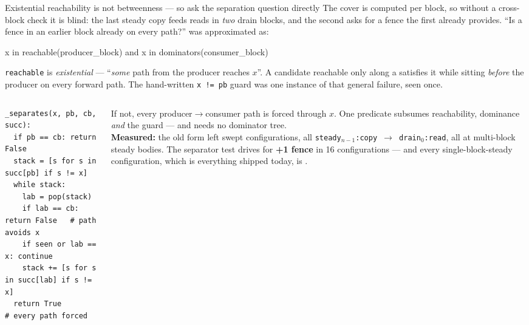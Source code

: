 \begin{frame}[fragile]{Existential reachability is not betweenness --- so ask the separation question directly}
\footnotesize
The cover is computed per block, so without a cross-block check it is blind: the last steady copy feeds reads in
\emph{two} drain blocks, and the second asks for a fence the first already provides.
``Is a fence in an earlier block already on every path?'' was approximated as:

\begin{center}\ttfamily\scriptsize
x in reachable(producer\_block) \quad and \quad x in dominators(consumer\_block) \quad\quad {}
\end{center}

 \texttt{reachable} is \emph{existential} --- ``\emph{some} path from the producer reaches
$x$''. A candidate reachable only along a  satisfies it while sitting \emph{before} the producer on
every forward path. The hand-written \texttt{x != pb} guard was one instance of that general failure, seen once.

\begin{columns}[T]
\begin{column}{0.52\textwidth}
\begin{lstlisting}[style=pseudo]
_separates(x, pb, cb, succ):
  if pb == cb: return False
  stack = [s for s in succ[pb] if s != x]
  while stack:
    lab = pop(stack)
    if lab == cb: return False   # path avoids x
    if seen or lab == x: continue
    stack += [s for s in succ[lab] if s != x]
  return True                    # every path forced
\end{lstlisting}
\end{column}
\begin{column}{0.48\textwidth}
 If not, every
producer$\to$consumer path is forced through $x$. One predicate subsumes reachability, dominance \emph{and} the
guard --- and needs no dominator tree.\\[4pt]
\textbf{Measured:} the old form left  swept
configurations, all \texttt{steady$_{n-1}$:copy $\to$ drain$_0$:read}, all at multi-block steady bodies.
The separator test drives  for \textbf{+1 fence} in 16 configurations --- and every
single-block-steady configuration, which is everything shipped today, is .
\end{column}
\end{columns}
\end{frame}
